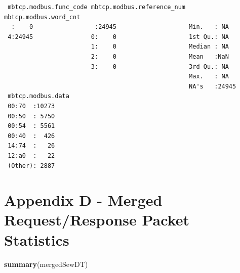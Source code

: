 \documentclass[12pt,]{article}
\newenvironment{Shaded}{\begin{snugshade}}{\end{snugshade}}
\newcommand{\KeywordTok}[1]{\textcolor[rgb]{0.13,0.29,0.53}{\textbf{{#1}}}}
\newcommand{\NormalTok}[1]{{#1}}
\begin{document}
\begin{verbatim}
 mbtcp.modbus.func_code mbtcp.modbus.reference_num mbtcp.modbus.word_cnt
  :    0                 :24945                    Min.   : NA          
 4:24945                0:    0                    1st Qu.: NA          
                        1:    0                    Median : NA          
                        2:    0                    Mean   :NaN          
                        3:    0                    3rd Qu.: NA          
                                                   Max.   : NA          
                                                   NA's   :24945        
 mbtcp.modbus.data
 00:70  :10273    
 00:50  : 5750    
 00:54  : 5561    
 00:40  :  426    
 14:74  :   26    
 12:a0  :   22    
 (Other): 2887    
\end{verbatim}

\thispagestyle{empty} \pagebreak

\section*{Appendix D - Merged Request/Response Packet
Statistics}\label{appendix-d---merged-requestresponse-packet-statistics}

\begin{Shaded}
\begin{Highlighting}[]
\KeywordTok{summary}\NormalTok{(mergedSewDT)}
\end{Highlighting}
\end{Shaded}
\end{document}
